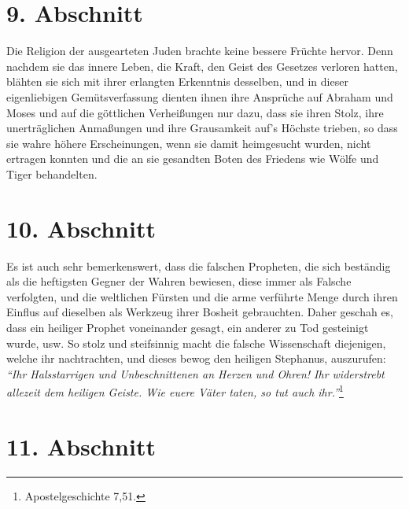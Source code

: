 \section{9. Abschnitt} \label{kap7_ab9}

Die Religion der ausgearteten Juden brachte
keine bessere Früchte hervor. Denn
nachdem sie das innere Leben, die Kraft, den Geist des
Gesetzes verloren hatten,
blähten sie sich mit ihrer erlangten Erkenntnis desselben, und in dieser
eigenliebigen Gemütsverfassung dienten ihnen ihre Ansprüche auf
Abraham und
Moses und auf die göttlichen
Verheißungen nur dazu, dass sie ihren Stolz, ihre
unerträglichen Anmaßungen und ihre
Grausamkeit auf's Höchste trieben, so dass sie
wahre höhere Erscheinungen, wenn sie damit heimgesucht
wurden, nicht ertragen
konnten und die an sie gesandten Boten des Friedens wie Wölfe und Tiger
behandelten.

\section{10. Abschnitt} \label{kap7_ab10}

Es ist auch sehr bemerkenswert, dass die falschen
Propheten, die sich beständig
als die heftigsten Gegner der Wahren bewiesen, diese immer als Falsche
verfolgten, und die weltlichen Fürsten und
die arme verführte Menge durch ihren
Einflus auf dieselben als Werkzeug ihrer Bosheit gebrauchten. Daher geschah es,
dass ein heiliger Prophet voneinander gesagt, ein anderer zu Tod gesteinigt
wurde, usw. So stolz und steifsinnig macht die falsche
Wissenschaft
diejenigen, welche ihr nachtrachten, und dieses bewog den heiligen
 Stephanus,
auszurufen:
\textit{"`Ihr Halsstarrigen und Unbeschnittenen an Herzen und Ohren! Ihr
widerstrebt allezeit dem heiligen Geiste. Wie euere Väter taten, so tut auch
ihr."'}\footnote{Apostelgeschichte 7,51.}

\section{11. Abschnitt} \label{kap7_ab11}

